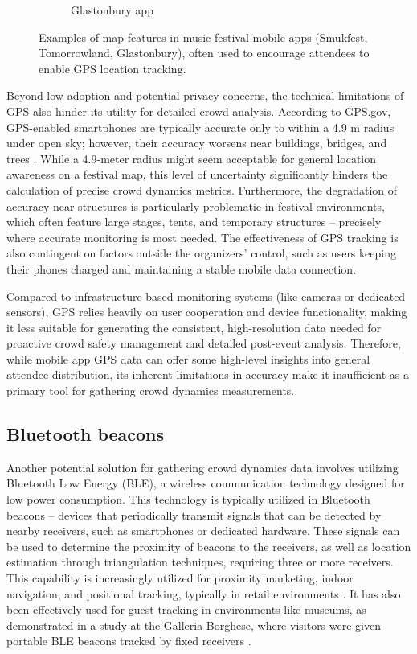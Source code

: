 \begin{figure}[H]
\begin{subfigure}{.3\textwidth}
    \caption{Glastonbury app \cite{glastonbury_app}}
    \label{fig:glastonbury_app}
  \end{subfigure}
  \caption{Examples of map features in music festival mobile apps (Smukfest, Tomorrowland, Glastonbury), often used to encourage attendees to enable GPS location tracking.}
  \label{fig:festival_apps}
\end{figure}


Beyond low adoption and potential privacy concerns, the technical limitations of GPS also hinder its utility for detailed crowd analysis. According to GPS.gov, GPS-enabled smartphones are typically accurate only to within a 4.9 m radius under open sky; however, their accuracy worsens near buildings, bridges, and trees \cite{gps}. While a 4.9-meter radius might seem acceptable for general location awareness on a festival map, this level of uncertainty significantly hinders the calculation of precise crowd dynamics metrics. Furthermore, the degradation of accuracy near structures is particularly problematic in festival environments, which often feature large stages, tents, and temporary structures -- precisely where accurate monitoring is most needed. The effectiveness of GPS tracking is also contingent on factors outside the organizers' control, such as users keeping their phones charged and maintaining a stable mobile data connection.

Compared to infrastructure-based monitoring systems (like cameras or dedicated sensors), GPS relies heavily on user cooperation and device functionality, making it less suitable for generating the consistent, high-resolution data needed for proactive crowd safety management and detailed post-event analysis. Therefore, while mobile app GPS data can offer some high-level insights into general attendee distribution, its inherent limitations in accuracy make it insufficient as a primary tool for gathering crowd dynamics measurements.

\subsection{Bluetooth beacons}
Another potential solution for gathering crowd dynamics data involves utilizing Bluetooth Low Energy (BLE), a wireless communication technology designed for low power consumption. This technology is typically utilized in Bluetooth beacons -- devices that periodically transmit signals that can be detected by nearby receivers, such as smartphones or dedicated hardware. These signals can be used to determine the proximity of beacons to the receivers, as well as location estimation through triangulation techniques, requiring three or more receivers. This capability is increasingly utilized for proximity marketing, indoor navigation, and positional tracking, typically in retail environments \cite{bt_beacon}. It has also been effectively used for guest tracking in environments like museums, as demonstrated in a study at the Galleria Borghese, where visitors were given portable BLE beacons tracked by fixed receivers \cite{borghese}.

